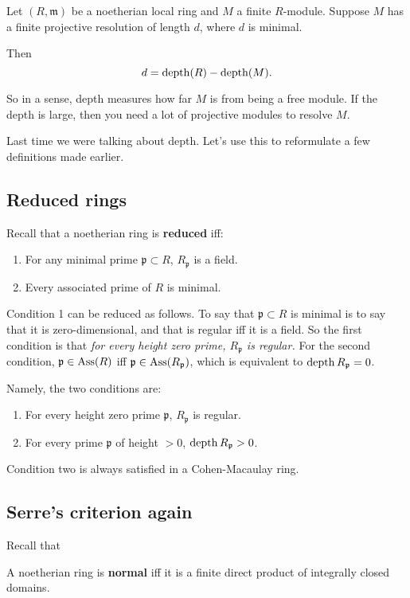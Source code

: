\begin{theorem} Let $(R,
\mathfrak{m})$ be a
noetherian local ring and $M$ a finite $R$-module. Suppose $M$
has a finite
projective resolution of length $d$, where $d$ is minimal.

Then
\[ d = \operatorname{depth}(R) - \operatorname{depth}(M).  \]
\end{theorem}
So in a sense, depth measures how far $M$ is from being a free
module. If the
depth is large, then you need a lot of projective modules to
resolve $M$.

Last time we were talking about depth. Let's use this to
reformulate a few
definitions made earlier.

\subsection{Reduced rings}
Recall that a noetherian ring is \textbf{reduced} iff:
\begin{enumerate}
\item For any minimal prime $\mathfrak{p} \subset R$,
$R_{\mathfrak{p}}$ is a
field.
\item Every associated prime of $R$ is minimal.
\end{enumerate}

Condition 1 can be reduced as follows. To say that
$\mathfrak{p}\subset R$ is
minimal is to say that it is zero-dimensional, and that is
regular iff it is a
field. So the first condition is that \emph{for every height
zero prime,
$R_{\mathfrak{p}}$ is regular.} For the second condition,
$\mathfrak{p} \in
\operatorname{Ass}(R)$ iff $\mathfrak{p} \in \operatorname{Ass}(R_{\mathfrak{p}})$, which is
equivalent to
$\operatorname{depth} R_{\mathfrak{p}} = 0$.

Namely, the two conditions are:
\begin{enumerate}
\item For every height zero prime $\mathfrak{p} $,
$R_{\mathfrak{p}}$ is
regular.
\item For every prime $\mathfrak{p}$ of height $>0$, $\operatorname{depth}
R_{\mathfrak{p}} >
0$.
\end{enumerate}

Condition two is always satisfied in a Cohen-Macaulay ring.

\subsection{Serre's criterion again}

Recall that
\begin{definition}
A noetherian ring is \textbf{normal} iff it is a finite direct
product of
integrally closed domains.
\end{definition}

